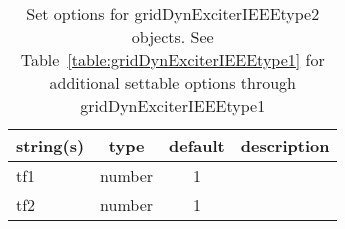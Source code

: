 \begin{table}[ht]
\centering
\begin{tabular}{p{5cm} c c p{7cm}}
\hline
string(s) & type & default & description \\
\hline
tf1 & number & 1 & \\
tf2 & number & 1 & \\
\hline
\end{tabular}
\caption{Set options for gridDynExciterIEEEtype2 objects. See Table~\ref{table:gridDynExciterIEEEtype1} for additional settable options through gridDynExciterIEEEtype1}
\label{table:gridDynExciterIEEEtype2}
\end{table}

